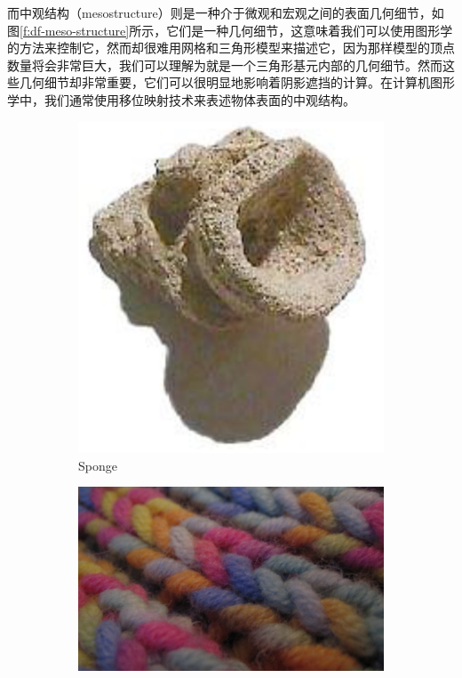 而中观结构（mesostructure）则是一种介于微观和宏观之间的表面几何细节，如图\ref{f:df-meso-structure}所示，它们是一种几何细节，这意味着我们可以使用图形学的方法来控制它，然而却很难用网格和三角形模型来描述它，因为那样模型的顶点数量将会非常巨大，我们可以理解为就是一个三角形基元内部的几何细节。然而这些几何细节却非常重要，它们可以很明显地影响着阴影遮挡的计算。在计算机图形学中，我们通常使用移位映射技术来表述物体表面的中观结构。

\begin{figure}
\begin{fullwidth}
	\begin{subfigure}[t]{0.17\thewidth}
		\includegraphics[width=\textwidth]{graphics/df/meso-structure-1}
		\caption{Sponge}
	\end{subfigure}
	\begin{subfigure}[t]{.285\thewidth}
		\includegraphics[width=\textwidth]{graphics/df/meso-structure-2}

\end{subfigure}
\end{fullwidth}
\end{figure}
